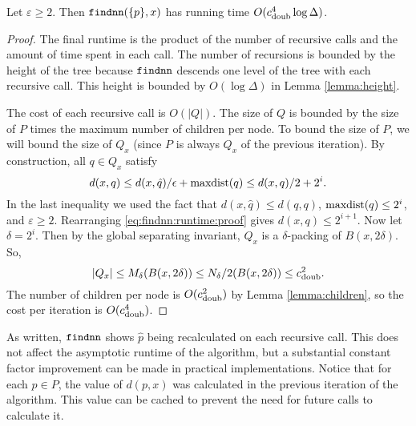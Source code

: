 \documentclass[../main.tex]{subfiles}
\newcommand{\dist}[2]{\distf({#1},{#2})}
\newcommand{\distf}{d}
\newcommand{\aspect}[1]{\Delta}
\newcommand{\doubnum}{c_\textnormal{doub}}
\newcommand{\mkfunction}[1]{\ifmmode{\text{{#1}}}}
\newcommand{\maxdist}[1]    {\mkfunction{maxdist}({#1})}
\newcommand{\mkprocedure}[1]{\textnormal{\ttfamily {#1}}}
\newcommand{\findnn}{\mkprocedure{findnn}}
\begin{document}
\begin{theorem}
    Let $\varepsilon\ge2$.
    Then $\findnn(\{p\},x)$ has running time $O(\doubnum^4\log\aspect{})$.
\end{theorem}

\begin{proof}
    The final runtime is the product of the number of recursive calls and the amount of time spent in each call.
    The number of recursions is bounded by the height of the tree because $\findnn$ descends one level of the tree with each recursive call. 
    This height is bounded by $O(\log\aspect{})$ in Lemma \ref{lemma:height}.

    The cost of each recursive call is $O(|Q|)$.
    The size of $Q$ is bounded by the size of $P$ times the maximum number of children per node.
    To bound the size of $P$, we will bound the size of $Q_x$ (since $P$ is always $Q_x$ of the previous iteration).
    By construction, all $q\in Q_x$ satisfy
    \begin{equation}
        \label{eq:findnn:runtime:proof}
        \dist{x}{q} 
        \le \dist{x}{\hat q}/\epsilon + \maxdist{q}
        \le \dist{x}{q}/2 + 2^i
        .
    \end{equation}
    In the last inequality we used the fact that $\dist{x}{\hat q} \le \dist{q}{q}$, $\maxdist{q}\le2^i$, and $\varepsilon\ge 2$.
    Rearranging \eqref{eq:findnn:runtime:proof} gives $\dist{x}{q} \le 2^{i+1}$.
    Now let $\delta=2^i$.
    Then by the global separating invariant, 
    $Q_x$ is a $\delta$-packing of $B(x,2\delta)$.
    So,
    \begin{equation}
        |Q_x|
        \le M_\delta(B(x,2\delta))
        \le N_\delta/2(B(x,2\delta))
        \le \doubnum^2
        .
    \end{equation}
    The number of children per node is $O(\doubnum^2)$ by Lemma \ref{lemma:children},
    so the cost per iteration is $O(\doubnum^4)$.
\end{proof}

\begin{remark}
    \fixme{}
As written, $\findnn$ shows $\hat p$ being recalculated on each recursive call.
This does not affect the asymptotic runtime of the algorithm,
but a substantial constant factor improvement can be made in practical implementations.
Notice that for each $p\in P$, the value of $\dist{p}{x}$ was calculated in the previous iteration of the algorithm.
This value can be cached to prevent the need for future calls to calculate it.
\end{remark}
\end{document}
